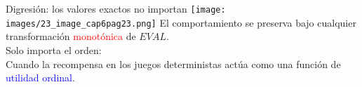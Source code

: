 \begin{frame}{Digresión: los valores exactos no importan}
\texttt{[image: images/23\_image\_cap6pag23.png]}
El comportamiento se preserva bajo cualquier transformación \textcolor{red}{monotónica} de $EVAL$. \\
Solo importa el orden:\\
\hspace{1cm} Cuando la recompensa en los juegos deterministas actúa como una función de \textcolor{blue}{utilidad ordinal}.
\end{frame}